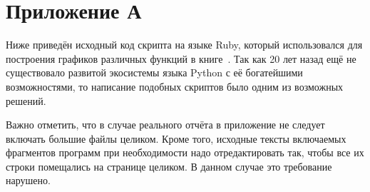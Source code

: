 \section{Приложение А}

Ниже приведён исходный код скрипта на языке Ruby, который использовался для
построения графиков различных функций в книге~\cite{roganov-jurists}.
Так как 20 лет назад ещё не существовало развитой экосистемы языка Python
с её богатейшими возможностями, то написание подобных скриптов было одним
из возможных решений.

Важно отметить, что в случае реального отчёта в приложение не следует включать
большие файлы целиком. Кроме того, исходные тексты включаемых фрагментов
программ при необходимости надо отредактировать так, чтобы все их строки
помещались на странице целиком. В данном случае это требование нарушено.



